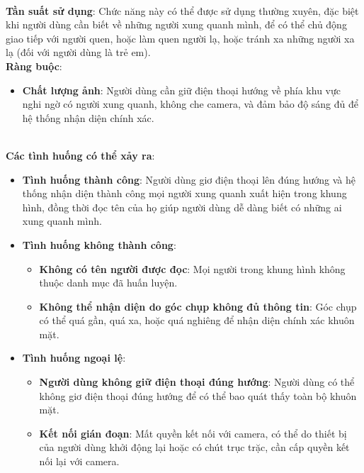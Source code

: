 \documentclass[a4paper,12pt]{article}
\begin{document}
\\
\textbf{Tần suất sử dụng}: Chức năng này có thể được sử dụng thường xuyên, đặc biệt khi người dùng cần biết về những người xung quanh mình, để có thể chủ động giao tiếp với người quen, hoặc làm quen người lạ, hoặc tránh xa những người xa lạ (đối với người dùng là trẻ em).
\\
\textbf{Ràng buộc}:
\begin{itemize}
    \item \textbf{Chất lượng ảnh}: Người dùng cần giữ điện thoại hướng về phía khu vực nghi ngờ có người xung quanh, không che camera, và đảm bảo độ sáng đủ để hệ thống nhận diện chính xác.
\end{itemize}
\\
\textbf{Các tình huống có thể xảy ra}:
\begin{itemize}
    \item \textbf{Tình huống thành công}: Người dùng giơ điện thoại lên đúng hướng và hệ thống nhận diện thành công mọi người xung quanh xuất hiện trong khung hình, đồng thời đọc tên của họ giúp người dùng dễ dàng biết có những ai xung quanh mình.
    \item \textbf{Tình huống không thành công}:
    \begin{itemize}
        \item \textbf{Không có tên người được đọc}: Mọi người trong khung hình không thuộc danh mục đã huấn luyện.
        \item \textbf{Không thể nhận diện do góc chụp không đủ thông tin}: Góc chụp có thể quá gần, quá xa, hoặc quá nghiêng để nhận diện chính xác khuôn mặt.
    \end{itemize}
    \item \textbf{Tình huống ngoại lệ}:
    \begin{itemize}
        \item \textbf{Người dùng không giữ điện thoại đúng hướng}: Người dùng có thể không giơ điện thoại đúng hướng để có thể bao quát thấy toàn bộ khuôn mặt.
        \item \textbf{Kết nối gián đoạn}: Mất quyền kết nối với camera, có thể do thiết bị của người dùng khởi động lại hoặc có chút trục trặc, cần cấp quyền kết nối lại với camera.
    \end{itemize}
\end{itemize}
\end{document}
